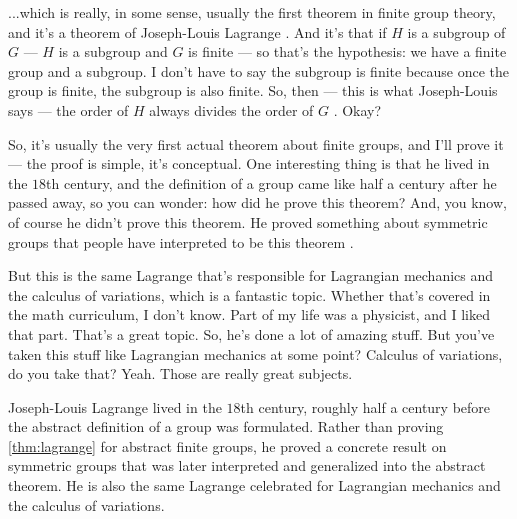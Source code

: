 \begin{speech}[00:10:04 - 00:12:05]
...which is really, in some sense, usually the first theorem in finite group theory, and it's a theorem of Joseph-Louis Lagrange . And it's that if $H$ is a subgroup of $G$  --- $H$ is a subgroup and $G$ is finite  --- so that's the hypothesis: we have a finite group and a subgroup. I don't have to say the subgroup is finite because once the group is finite, the subgroup is also finite. So, then --- this is what Joseph-Louis says --- the order of $H$ always divides the order of $G$ . Okay?

So, it's usually the very first actual theorem about finite groups, and I'll prove it --- the proof is simple, it's conceptual. One interesting thing is that he lived in the $18$th century, and the definition of a group came like half a century after he passed away, so you can wonder: how did he prove this theorem? And, you know, of course he didn't prove this theorem. He proved something about symmetric groups that people have interpreted to be this theorem .

But this is the same Lagrange that's responsible for Lagrangian mechanics and the calculus of variations, which is a fantastic topic. Whether that's covered in the math curriculum, I don't know. Part of my life was a physicist, and I liked that part. That's a great topic. So, he's done a lot of amazing stuff. But you've taken this stuff like Lagrangian mechanics at some point? Calculus of variations, do you take that? Yeah. Those are really great subjects.
\end{speech}

\begin{content}
\end{content}

\begin{insight}
Joseph-Louis Lagrange lived in the $18$th century, roughly half a century before the abstract definition of a group was formulated. Rather than proving \cref{thm:lagrange} for abstract finite groups, he proved a concrete result on symmetric groups that was later interpreted and generalized into the abstract theorem. He is also the same Lagrange celebrated for Lagrangian mechanics and the calculus of variations.
\end{insight}

